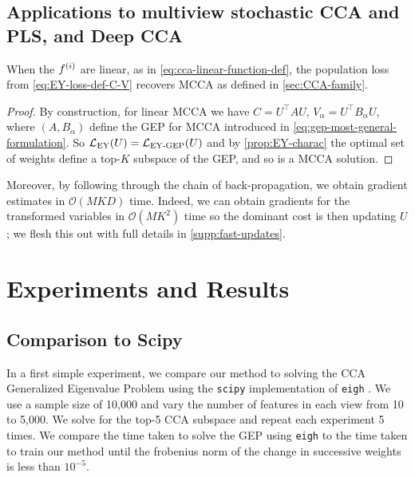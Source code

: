\subsection{Applications to multiview stochastic CCA and PLS, and Deep CCA}
\begin{lemma}
    When the $f^{(i)}$ are linear, as in \cref{eq:cca-linear-function-def}, the population loss from \cref{eq:EY-loss-def-C-V} recovers MCCA as defined in \cref{sec:CCA-family}. %
\end{lemma}
\begin{proof}
    By construction, for linear MCCA we have $C = U^\top A U,\, V_\alpha=U^\top B_\alpha U$, where $(A, B_\alpha)$ define the GEP for MCCA introduced in \cref{eq:gep-most-general-formulation}. 
    So $\mathcal{L}_\text{EY}(U) = \mathcal{L}_\text{EY-GEP}(U)$ and by \cref{prop:EY-charac} the optimal set of weights define a top-$K$ subspace of the GEP, and so is a MCCA solution.
\end{proof}

Moreover, by following through the chain of back-propagation, we obtain gradient estimates in $\mathcal{O}(MKD)$ time.
Indeed, we can obtain gradients for the transformed variables in $\mathcal{O}(M K^2)$ time so the dominant cost is then updating $U$; we flesh this out with full details in \cref{supp:fast-updates}.

\section{Experiments and Results}

\subsection{Comparison to Scipy}
In a first simple experiment, we compare our method to solving the CCA Generalized Eigenvalue Problem using the \texttt{scipy} implementation of \texttt{eigh} \citep{virtanen2020scipy}.
We use a sample size of 10,000 and vary the number of features in each view from 10 to 5,000.
We solve for the top-5 CCA subspace and repeat each experiment 5 times.
We compare the time taken to solve the GEP using \texttt{eigh} to the time taken to train our method until the frobenius norm of the change in successive weights is less than $10^{-5}$.

